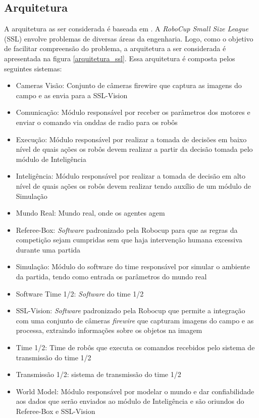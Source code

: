 \subsection{Arquitetura}

A arquitetura as ser considerada é baseada em \cite{felixnavarro}.
A \textit{RoboCup Small Size League} (SSL) envolve problemas de diversas áreas
da engenharia. Logo, como o objetivo de facilitar compreensão do
problema, a arquitetura a ser considerada é apresentada na figura
\ref{arquitetura_ssl}. Essa arquitetura é composta pelos seguintes
sistemas:

\begin{itemize}
  \item Cameras Visão: Conjunto de câmeras firewire que captura as imagens do
        campo e as envia para a SSL-Vision
  \item Comunicação: Módulo responsável por receber os parâmetros
        dos motores e enviar o comando via onddas de radio para os
        robôs
  \item Execução: Módulo responsável por realizar a tomada de decisões
        em baixo nível de quais ações os robôs devem realizar a partir
        da decisão tomada pelo módulo de Inteligência
  \item Inteligência: Módulo responsável por realizar a tomada de
        decisão em alto nível de quais ações os robôs devem realizar 
        tendo auxílio de um módulo de Simulação
  \item Mundo Real: Mundo real, onde os agentes agem
  \item Referee-Box: \textit{Software} padronizado pela Robocup para que as
        regras da competição sejam cumpridas sem que haja intervenção
        humana excessiva durante uma partida
  \item Simulação: Módulo do software do time responsável por simular
        o ambiente da partida, tendo como entrada os parâmetros do mundo
        real
  \item Software Time 1/2: \textit{Software} do time 1/2
  \item SSL-Vision: \textit{Software} padronizado pela Robocup que permite a
        integração com uma conjunto de câmeras \textit{firewire} que capturam 
        imagens do campo e as processa, extraindo informações sobre os objetos na
        imagem
  \item Time 1/2: Time de robôs que executa os comandos recebidos pelo
        sistema de transmissão do time 1/2
  \item Transmissão 1/2: sistema de transmissão do time 1/2
  \item World Model: Módulo responsável por modelar o mundo e dar
        confiabilidade aos dados que serão enviados ao módulo de
        Inteligência e são oriundos do Referee-Box e SSL-Vision
\end{itemize}

